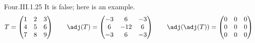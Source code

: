 \begin{ans}{Four.III.1.25}
      It is false; here is an example.
      \begin{equation*}
         T=\begin{pmatrix}
           1  &2   &3  \\
           4  &5   &6  \\
           7  &8   &9
         \end{pmatrix}
         \qquad
         \adj(T)=\begin{pmatrix}
          -3  &6   &-3 \\
           6  &-12 &6  \\
          -3  &6   &-3
         \end{pmatrix}
         \qquad
         \adj(\adj(T))=\begin{pmatrix}
           0  &0   &0  \\
           0  &0   &0  \\
           0  &0   &0
         \end{pmatrix}
      \end{equation*}
    
\end{ans}
